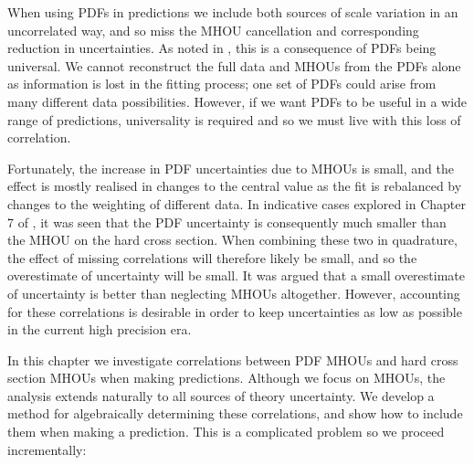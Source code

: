 When using PDFs in predictions we include both sources of scale variation in an uncorrelated way, and so miss the MHOU cancellation and corresponding reduction in uncertainties. As noted in \cite{MHOUbig}, this is a consequence of PDFs being universal. We cannot reconstruct the full data and MHOUs from the PDFs alone as information is lost in the fitting process; one set of PDFs could arise from many different data possibilities. However, if we want PDFs to be useful in a wide range of predictions, universality is required and so we must live with this loss of correlation.

Fortunately, the increase in PDF uncertainties due to MHOUs is small, and the effect is mostly realised in changes to the central value as the fit is rebalanced by changes to the weighting of different data. In indicative cases explored in Chapter 7 of \cite{MHOUbig}, it was seen that the PDF uncertainty is consequently much smaller than the MHOU on the hard cross section. When combining these two in quadrature, the effect of missing correlations will therefore likely be small, and so the overestimate of uncertainty will be small. It was argued that a small overestimate of uncertainty is better than neglecting MHOUs altogether. However, accounting for these correlations is desirable in order to keep uncertainties as low as possible in the current high precision era.

In this chapter we investigate correlations between PDF MHOUs and hard cross section MHOUs when making predictions. Although we focus on MHOUs, the analysis extends naturally to all sources of theory uncertainty. We develop a method for algebraically determining these correlations, and show how to include them when making a prediction. This is a complicated problem so we proceed incrementally:


